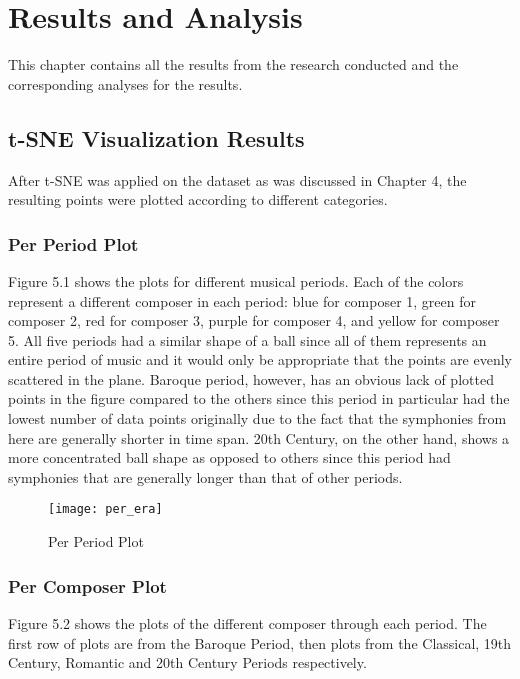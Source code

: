 %
%
%                 

\chapter{Results and Analysis}
This chapter contains all the results from the research conducted and the corresponding analyses for the results.

\section{t-SNE Visualization Results}
After t-SNE was applied on the dataset as was discussed in Chapter 4, the resulting points were plotted according to different categories.

\subsection{Per Period Plot}
Figure 5.1 shows the plots for different musical periods. Each of the colors represent a different composer in each period:  blue for composer 1, green for composer 2, red for composer 3, purple for composer 4, and yellow for composer 5. All five periods had a similar shape of a ball since all of them represents an entire period of music and it would only be appropriate that the points are evenly scattered in the plane. Baroque period, however, has an obvious lack of plotted points in the figure compared to the others since this period in particular had the lowest number of data points originally due to the fact that the symphonies from here are generally shorter in time span. 20th Century, on the other hand, shows a more concentrated ball shape as opposed to others since this period had symphonies that are generally longer than that of other periods.

\begin{figure}[!htb]
\caption{Per Period Plot}
\centering
\texttt{[image: per\_era]}
\end{figure}

\subsection{Per Composer Plot}
Figure 5.2 shows the plots of the different composer through each period. The first row of plots are from the Baroque Period, then plots from the Classical, 19th Century, Romantic and 20th Century Periods respectively.

